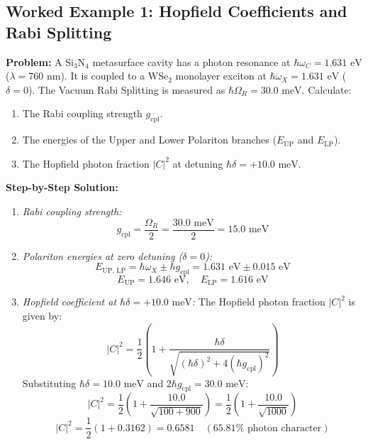 \documentclass[11pt,a4paper]{article}
\begin{document}
\subsection{Worked Example 1: Hopfield Coefficients and Rabi Splitting}
\textbf{Problem:} A $\text{Si}_3\text{N}_4$ metasurface cavity has a photon resonance at $\hbar\omega_C = 1.631\text{ eV}$ ($\lambda = 760\text{ nm}$). It is coupled to a $\text{WSe}_2$ monolayer exciton at $\hbar\omega_X = 1.631\text{ eV}$ ($\delta = 0$). The Vacuum Rabi Splitting is measured as $\hbar\Omega_R = 30.0\text{ meV}$. Calculate:
\begin{enumerate}
    \item The Rabi coupling strength $g_{\text{cpl}}$.
    \item The energies of the Upper and Lower Polariton branches ($E_{\text{UP}}$ and $E_{\text{LP}}$).
    \item The Hopfield photon fraction $|C|^2$ at detuning $\hbar\delta = +10.0\text{ meV}$.
\end{enumerate}

\textbf{Step-by-Step Solution:}
\begin{enumerate}
    \item \textit{Rabi coupling strength:}
    \begin{equation}
    g_{\text{cpl}} = \frac{\Omega_R}{2} = \frac{30.0\text{ meV}}{2} = 15.0\text{ meV}
    \end{equation}
    \item \textit{Polariton energies at zero detuning ($\delta = 0$):}
    \begin{equation}
    E_{\text{UP, LP}} = \hbar\omega_X \pm \hbar g_{\text{cpl}} = 1.631\text{ eV} \pm 0.015\text{ eV}
    \end{equation}
    $$E_{\text{UP}} = 1.646\text{ eV}, \quad E_{\text{LP}} = 1.616\text{ eV}$$
    \item \textit{Hopfield coefficient at $\hbar\delta = +10.0\text{ meV}$:}
    The Hopfield photon fraction $|C|^2$ is given by:
    \begin{equation}
    |C|^2 = \frac{1}{2} \left( 1 + \frac{\hbar\delta}{\sqrt{(\hbar\delta)^2 + 4(\hbar g_{\text{cpl}})^2}} \right)
    \end{equation}
    Substituting $\hbar\delta = 10.0\text{ meV}$ and $2\hbar g_{\text{cpl}} = 30.0\text{ meV}$:
    \begin{equation}
    |C|^2 = \frac{1}{2} \left( 1 + \frac{10.0}{\sqrt{100 + 900}} \right) = \frac{1}{2} \left( 1 + \frac{10.0}{\sqrt{1000}} \right)
    \end{equation}
    $$|C|^2 = \frac{1}{2} (1 + 0.3162) = 0.6581 \quad (65.81\% \text{ photon character})$$
\end{enumerate}
\end{document}
